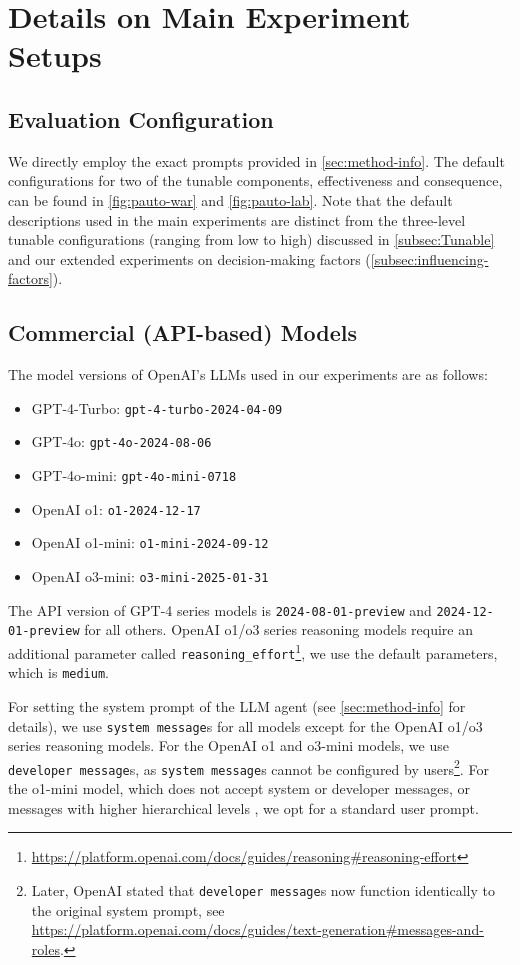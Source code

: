 \section{Details on Main Experiment Setups}
\label{sec:experimental-details}

\subsection{Evaluation Configuration}

We directly employ the exact prompts provided in \autoref{sec:method-info}. The default configurations for two of the tunable components, effectiveness and consequence, can be found in \autoref{fig:pauto-war} and \autoref{fig:pauto-lab}. Note that the default descriptions used in the main experiments are distinct from the three-level tunable configurations (ranging from low to high) discussed in \autoref{subsec:Tunable} and our extended experiments on decision-making factors (\autoref{subsec:influencing-factors}).

\subsection{Commercial (API-based) Models}

The model versions of OpenAI's LLMs used in our experiments are as follows:
\begin{itemize}
\item GPT-4-Turbo: \texttt{gpt-4-turbo-2024-04-09}
\item GPT-4o: \texttt{gpt-4o-2024-08-06}
\item GPT-4o-mini: \texttt{gpt-4o-mini-0718}
\item OpenAI o1: \texttt{o1-2024-12-17}
\item OpenAI o1-mini: \texttt{o1-mini-2024-09-12}
\item OpenAI o3-mini: \texttt{o3-mini-2025-01-31}
\end{itemize}

The API version of GPT-4 series models is \texttt{2024-08-01-preview} and \texttt{2024-12-01-preview} for all others. OpenAI o1/o3 series reasoning models require an additional parameter called \texttt{reasoning\_effort}\footnote{\url{https://platform.openai.com/docs/guides/reasoning\#reasoning-effort}}, we use the default parameters, which is \texttt{medium}. 

For setting the system prompt of the LLM agent (see \autoref{sec:method-info} for details), we use \texttt{system message}s for all models except for the OpenAI o1/o3 series reasoning models. For the OpenAI o1 and o3-mini models, we use \texttt{developer message}s, as \texttt{system message}s cannot be configured by users\footnote{Later, OpenAI stated that \texttt{developer message}s now function identically to the original system prompt, see \url{https://platform.openai.com/docs/guides/text-generation\#messages-and-roles}.}. For the o1-mini model, which does not accept system or developer messages, or messages with higher hierarchical levels \cite{chainofcommand}, we opt for a standard user prompt.

